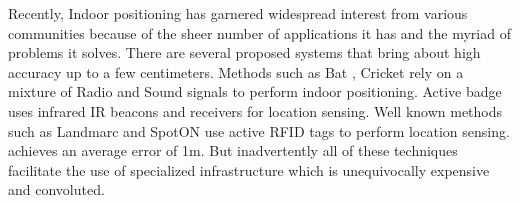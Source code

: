 \documentclass[twocolumn, 11pt]{IEEEtran}
\begin{document}



Recently, Indoor positioning has garnered widespread interest from various communities because of the sheer number of applications it has and the myriad of problems it solves.
There are several proposed systems that bring about high accuracy up to a few centimeters. 
Methods such as Bat \cite{barshan1992bat}, Cricket \cite{priyantha2000cricket} rely on a mixture of Radio and Sound signals to perform indoor positioning. Active badge \cite{want1992active} uses infrared IR beacons and receivers for location sensing. 
Well known methods such as Landmarc \cite{ni2004landmarc} and SpotON \cite{ hightower2000spoton} use active RFID tags to perform location sensing. \cite{ni2004landmarc} achieves an average error of 1m. But inadvertently all of these techniques facilitate the use of specialized infrastructure which is unequivocally expensive and convoluted.
\end{document}
